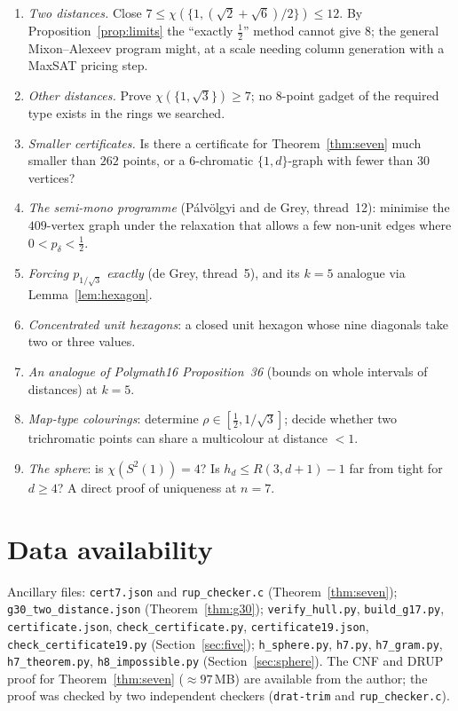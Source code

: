 \documentclass[11pt,a4paper]{amsart}
\theoremstyle{remark}
\begin{document}
\begin{enumerate}
\item \emph{Two distances.} Close $7\le\chi(\{1,(\sqrt2+\sqrt6)/2\})\le12$. By Proposition~\ref{prop:limits} the ``exactly $\tfrac12$'' method cannot give $8$; the general Mixon--Alexeev program might, at a scale needing column generation with a MaxSAT pricing step.
\item \emph{Other distances.} Prove $\chi(\{1,\sqrt3\})\ge7$; no $8$-point gadget of the required type exists in the rings we searched.
\item \emph{Smaller certificates.} Is there a certificate for Theorem~\ref{thm:seven} much smaller than $262$ points, or a $6$-chromatic $\{1,d\}$-graph with fewer than $30$ vertices?
\item \emph{The semi-mono programme} (P\'alv\"olgyi and de Grey, thread~12): minimise the $409$-vertex graph under the relaxation that allows a few non-unit edges where $0<p_\delta<\tfrac12$.
\item \emph{Forcing $p_{1/\sqrt3}$ exactly} (de Grey, thread~5), and its $k=5$ analogue via Lemma~\ref{lem:hexagon}.
\item \emph{Concentrated unit hexagons}: a closed unit hexagon whose nine diagonals take two or three values.
\item \emph{An analogue of Polymath16 Proposition~36} (bounds on whole intervals of distances) at $k=5$.
\item \emph{Map-type colourings}: determine $\rho\in[\tfrac12,1/\sqrt3]$; decide whether two trichromatic points can share a multicolour at distance $<1$.
\item \emph{The sphere}: is $\chi(S^2(1))=4$? Is $h_d\le R(3,d+1)-1$ far from tight for $d\ge4$? A direct proof of uniqueness at $n=7$.
\end{enumerate}

\section*{Data availability}
Ancillary files: \texttt{cert7.json} and \texttt{rup\_checker.c} (Theorem~\ref{thm:seven}); \texttt{g30\_two\_distance.json} (Theorem~\ref{thm:g30}); \texttt{verify\_hull.py}, \texttt{build\_g17.py}, \texttt{certificate.json}, \texttt{check\_certificate.py}, \texttt{certificate19.json}, \texttt{check\_certificate19.py} (Section~\ref{sec:five}); \texttt{h\_sphere.py}, \texttt{h7.py}, \texttt{h7\_gram.py}, \texttt{h7\_theorem.py}, \texttt{h8\_impossible.py} (Section~\ref{sec:sphere}). The CNF and DRUP proof for Theorem~\ref{thm:seven} ($\approx97$\,MB) are available from the author; the proof was checked by two independent checkers (\texttt{drat-trim} and \texttt{rup\_checker.c}).
\end{document}
